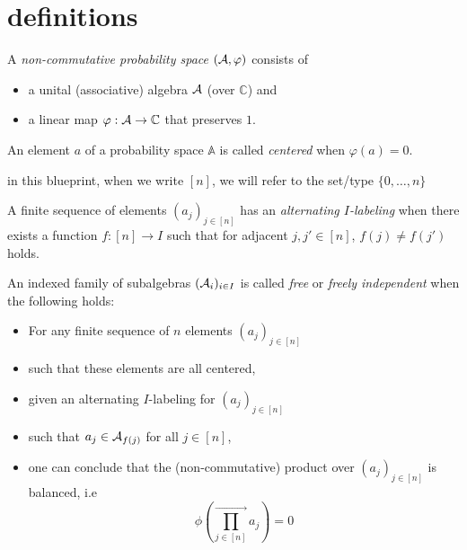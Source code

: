 
\chapter{definitions}
\begin{definition}
  \label{def:probability-space}
  A \textit{non-commutative probability space} \((\mathcal{A},\varphi)\) consists of
  \begin{itemize}
    \item a unital (associative) algebra \(\mathcal{A}\) (over \(\mathbb{C}\)) and
    \item a linear map \(\varphi:\mathcal{A} \rightarrow \mathbb{C}\) that preserves \(1\).
  \end{itemize}
\end{definition}

\begin{definition}
  \label{def:centered}
  An element \(a\) of a probability space \(\mathbb{A}\) is called \textit{centered} when
  \(\varphi(a)=0\).
\end{definition}

in this blueprint, when we write \([n]\), we will refer to the set/type \(\{0,\ldots,n\}\)

\begin{definition}
  \label{def:alternating-label}
  A finite sequence of elements \((a_j)_{j\in [n]}\) has an \textit{alternating \(I\)-labeling} when
  there exists a function \(f:[n]\rightarrow I\) such that for adjacent \(j,j' \in [n]\),
  \(f(j)\neq f(j')\) holds.
\end{definition}

\begin{definition}
  \label{def:FreeIndep}
  An indexed family of subalgebras \((\mathcal{A}_i)_{i\in I}\) is called \textit{free} or
  \textit{freely independent} when the following holds:
  \begin{itemize}
    \item For any finite sequence of \(n\) elements \((a_j)_{j\in [n]}\)
    \item such that these elements are all centered,
    \item given an alternating \(I\)-labeling for \((a_j)_{j\in [n]}\)
    \item such that \(a_j \in \mathcal{A}_{f(j)}\) for all \(j\in [n]\),
    \item one can conclude that the (non-commutative) product over \((a_j)_{j\in [n]}\) is balanced, i.e
      \[\phi\left(\prod_{j\in[n]}^{\rightarrow} a_j\right) = 0\]
  \end{itemize}
\end{definition}
